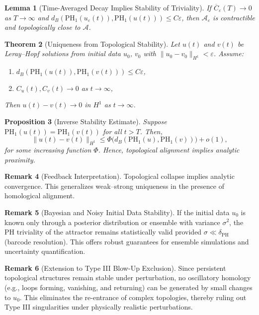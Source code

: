 \documentclass[11pt]{article}
\newtheorem{theorem}{Theorem}[section]
\newtheorem{lemma}[theorem]{Lemma}
\newtheorem{proposition}[theorem]{Proposition}
\theoremstyle{definition}
\newtheorem{remark}[theorem]{Remark}
\begin{document}
\begin{lemma}[Time-Averaged Decay Implies Stability of Triviality]
If $\overline{C}_\varepsilon(T) \to 0$ as $T \to \infty$ and $d_B(\mathrm{PH}_1(u_\varepsilon(t)), \mathrm{PH}_1(u(t))) \le C \varepsilon$, then $\mathcal{A}_\varepsilon$ is contractible and topologically close to $\mathcal{A}$.
\end{lemma}

\begin{theorem}[Uniqueness from Topological Stability]
Let $u(t)$ and $v(t)$ be Leray--Hopf solutions from initial data $u_0$, $v_0$ with $\|u_0 - v_0\|_{H^1} < \varepsilon$. Assume:
\begin{enumerate}
  \item $d_B(\mathrm{PH}_1(u(t)), \mathrm{PH}_1(v(t))) \leq C\varepsilon$,
  \item $C_u(t), C_v(t) \to 0$ as $t \to \infty$,
\end{enumerate}
Then $u(t) - v(t) \to 0$ in $H^1$ as $t \to \infty$.
\end{theorem}

\begin{proposition}[Inverse Stability Estimate]
Suppose $\mathrm{PH}_1(u(t)) = \mathrm{PH}_1(v(t))$ for all $t > T$. Then,
\[
\|u(t) - v(t)\|_{H^1} \le \Phi\big(d_B(\mathrm{PH}_1(u), \mathrm{PH}_1(v))\big) + o(1),
\]
for some increasing function $\Phi$. Hence, topological alignment implies analytic proximity.
\end{proposition}

\begin{remark}[Feedback Interpretation]
Topological collapse implies analytic convergence. This generalizes weak--strong uniqueness in the presence of homological alignment.
\end{remark}

\begin{remark}[Bayesian and Noisy Initial Data Stability]
If the initial data $u_0$ is known only through a posterior distribution or ensemble with variance $\sigma^2$, the PH triviality of the attractor remains statistically valid provided $\sigma \ll \delta_{\mathrm{PH}}$ (barcode resolution). This offers robust guarantees for ensemble simulations and uncertainty quantification.
\end{remark}

\begin{remark}[Extension to Type III Blow-Up Exclusion]
Since persistent topological structures remain stable under perturbation, no oscillatory homology (e.g., loops forming, vanishing, and returning) can be generated by small changes to $u_0$. This eliminates the re-entrance of complex topologies, thereby ruling out Type III singularities under physically realistic perturbations.
\end{remark}
\end{document}
